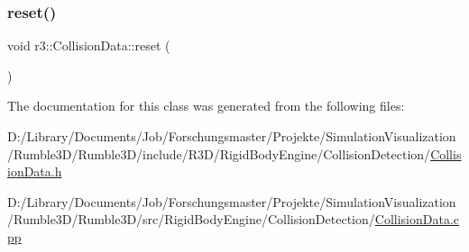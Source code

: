 \mbox{\label{classr3_1_1_collision_data_af74822ca6881f5ab54447a73ac26d7fd}} 
\subsubsection{\texorpdfstring{reset()}{reset()}}
{\footnotesize\ttfamily void r3\+::\+Collision\+Data\+::reset (\begin{DoxyParamCaption}{ }\end{DoxyParamCaption})}



The documentation for this class was generated from the following files\+:\begin{DoxyCompactItemize}
\item 
D\+:/\+Library/\+Documents/\+Job/\+Forschungsmaster/\+Projekte/\+Simulation\+Visualization/\+Rumble3\+D/\+Rumble3\+D/include/\+R3\+D/\+Rigid\+Body\+Engine/\+Collision\+Detection/\mbox{\hyperlink{_collision_data_8h}{Collision\+Data.\+h}}\item 
D\+:/\+Library/\+Documents/\+Job/\+Forschungsmaster/\+Projekte/\+Simulation\+Visualization/\+Rumble3\+D/\+Rumble3\+D/src/\+Rigid\+Body\+Engine/\+Collision\+Detection/\mbox{\hyperlink{_collision_data_8cpp}{Collision\+Data.\+cpp}}\end{DoxyCompactItemize}
